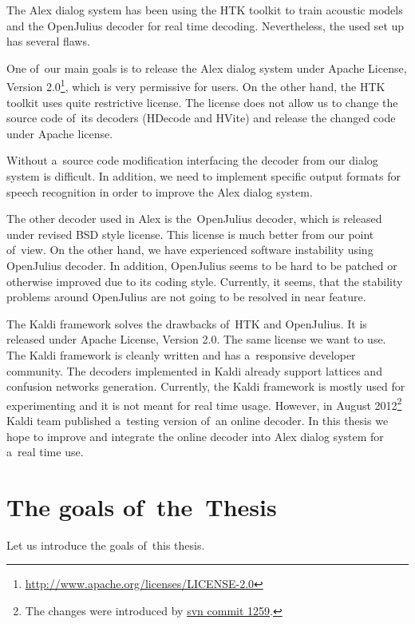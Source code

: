 The Alex dialog system has been using the HTK toolkit\cite{young94htk} to train acoustic models and the OpenJulius\cite{lee2009julius} decoder for real time decoding. Nevertheless, the used set up has several flaws.

One of~our main goals is to release the Alex dialog system under Apache License, Version 2.0\footnote{\url{http://www.apache.org/licenses/LICENSE-2.0}}, which is very permissive for users. On the other hand, the HTK toolkit uses quite restrictive license. The license does not allow us to change the source code of~its decoders (HDecode and HVite) and release the changed code under Apache license. 

Without a~source code modification interfacing the decoder from our dialog system is difficult. In addition, we need to implement specific output formats for speech recognition in order to improve the Alex dialog system.

The other decoder used in Alex is the~OpenJulius decoder, which is released under revised BSD style license. This license is much better from our point of~view. On the other hand, we have experienced software instability using OpenJulius decoder. In addition, OpenJulius seems to be hard to be patched or otherwise improved due to its coding style. Currently, it seems, that the stability problems around OpenJulius are not going to be resolved in near feature.

The Kaldi\cite{povey2011kaldi} framework solves the drawbacks of~HTK and OpenJulius. It is released under Apache License, Version 2.0. The same license we want to use. The Kaldi framework is cleanly written and has a~responsive developer community. The decoders implemented in Kaldi already support lattices and confusion networks generation. Currently, the Kaldi framework is mostly used for experimenting and it is not meant for real time usage. However, in August 2012\footnote{The changes were introduced by \href{https://sourceforge.net/p/kaldi/code/1259/}{svn commit 1259}.} Kaldi team published a~testing version of~an online decoder. In this thesis we hope to improve and integrate the online decoder into Alex dialog system for a~real time use.


\section{The goals of~the~Thesis} 
\label{sec:goals}
Let us introduce the goals of~this thesis.

